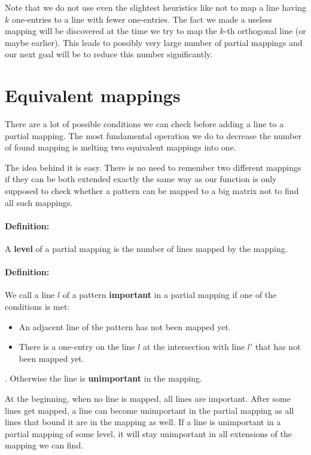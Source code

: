 Note that we do not use even the slightest heuristics like not to map a line having $k$ one-entries to a line with fewer one-entries. The fact we made a useless mapping will be discovered at the time we try to map the $k$-th orthogonal line (or maybe earlier). This leads to possibly very large number of partial mappings and our next goal will be to reduce this number significantly.

\section{Equivalent mappings}
There are a lot of possible conditions we can check before adding a line to a partial mapping. The most fundamental operation we do to decrease the number of found mapping is melting two equivalent mappings into one.

The idea behind it is easy. There is no need to remember two different mappings if they can be both extended exactly the same way as our function is only supposed to check whether a pattern can be mapped to a big matrix not to find all such mappings.
\paragraph{Definition:}
A \textbf{level} of a partial mapping is the number of lines mapped by the mapping.
\paragraph{Definition:}
We call a line $l$ of a pattern \textbf{important} in a partial mapping if one of the conditions is met:
\begin{itemize}
\item An adjacent line of the pattern has not been mapped yet.
\item There is a one-entry on the line $l$ at the intersection with line $l'$ that has not been mapped yet.
\end{itemize}.
Otherwise the line is \textbf{unimportant} in the mapping.

At the beginning, when no line is mapped, all lines are important. After some lines get mapped, a line can become unimportant in the partial mapping as all lines that bound it are in the mapping as well. If a line is unimportant in a partial mapping of some level, it will stay unimportant in all extensions of the mapping we can find.
